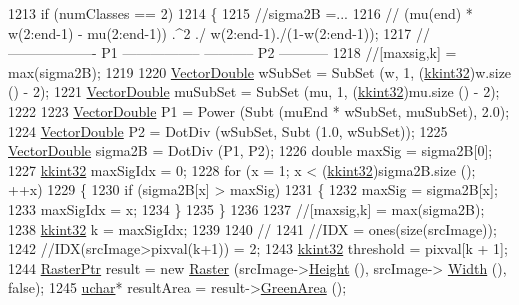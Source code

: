 \begin{DoxyCode}
{{1213   \textcolor{keywordflow}{if}  (numClasses == 2)
1214   \{
1215     \textcolor{comment}{//sigma2B =...}
1216     \textcolor{comment}{//    (mu(end) * w(2:end-1) - mu(2:end-1)) .^2  ./  w(2:end-1)./(1-w(2:end-1));}
1217     \textcolor{comment}{//    ------------------- P1 -----------------      ----------- P2 -----------}
1218     \textcolor{comment}{//[maxsig,k] = max(sigma2B);}
1219 
1220     \hyperlink{namespace_k_k_b_a5906c207479607e5f450434095914a41}{VectorDouble}  wSubSet  = SubSet (w,  1, (\hyperlink{namespace_k_k_b_a8fa4952cc84fda1de4bec1fbdd8d5b1b}{kkint32})w.size  () - 2);
1221     \hyperlink{namespace_k_k_b_a5906c207479607e5f450434095914a41}{VectorDouble}  muSubSet = SubSet (mu, 1, (\hyperlink{namespace_k_k_b_a8fa4952cc84fda1de4bec1fbdd8d5b1b}{kkint32})mu.size () - 2);
1222    
1223     \hyperlink{namespace_k_k_b_a5906c207479607e5f450434095914a41}{VectorDouble} P1 = Power (Subt (muEnd * wSubSet, muSubSet), 2.0);
1224     \hyperlink{namespace_k_k_b_a5906c207479607e5f450434095914a41}{VectorDouble} P2 = DotDiv (wSubSet, Subt (1.0, wSubSet));
1225     \hyperlink{namespace_k_k_b_a5906c207479607e5f450434095914a41}{VectorDouble} sigma2B = DotDiv (P1, P2);
1226     \textcolor{keywordtype}{double}  maxSig = sigma2B[0];
1227     \hyperlink{namespace_k_k_b_a8fa4952cc84fda1de4bec1fbdd8d5b1b}{kkint32} maxSigIdx = 0;
1228     \textcolor{keywordflow}{for}  (x = 1;  x < (\hyperlink{namespace_k_k_b_a8fa4952cc84fda1de4bec1fbdd8d5b1b}{kkint32})sigma2B.size ();  ++x)
1229     \{
1230       \textcolor{keywordflow}{if}  (sigma2B[x] > maxSig)
1231       \{
1232         maxSig = sigma2B[x];
1233         maxSigIdx = x;
1234       \}
1235     \}
1236       
1237     \textcolor{comment}{//[maxsig,k] = max(sigma2B);}
1238     \hyperlink{namespace_k_k_b_a8fa4952cc84fda1de4bec1fbdd8d5b1b}{kkint32}  k = maxSigIdx;
1239     
1240     \textcolor{comment}{//%
1241     \textcolor{comment}{//IDX = ones(size(srcImage));}
1242     \textcolor{comment}{//IDX(srcImage>pixval(k+1)) = 2;}
1243     \hyperlink{namespace_k_k_b_a8fa4952cc84fda1de4bec1fbdd8d5b1b}{kkint32}  threshold = pixval[k + 1];
1244     \hyperlink{class_k_k_b_1_1_raster}{RasterPtr}  result = \textcolor{keyword}{new} \hyperlink{class_k_k_b_1_1_raster}{Raster} (srcImage->\hyperlink{class_k_k_b_1_1_raster_af8d10d15697d5b92fb9595c48b529feb}{Height} (), srcImage->
      \hyperlink{class_k_k_b_1_1_raster_aa2780c0b7ae75b7b595f99329689c1f6}{Width} (), \textcolor{keyword}{false});
1245     \hyperlink{namespace_k_k_b_ace9969169bf514f9ee6185186949cdf7}{uchar}*  resultArea = result->\hyperlink{class_k_k_b_1_1_raster_af6ceacfa7835a295d239d141627dbec7}{GreenArea} ();
}}}
\end{DoxyCode}

